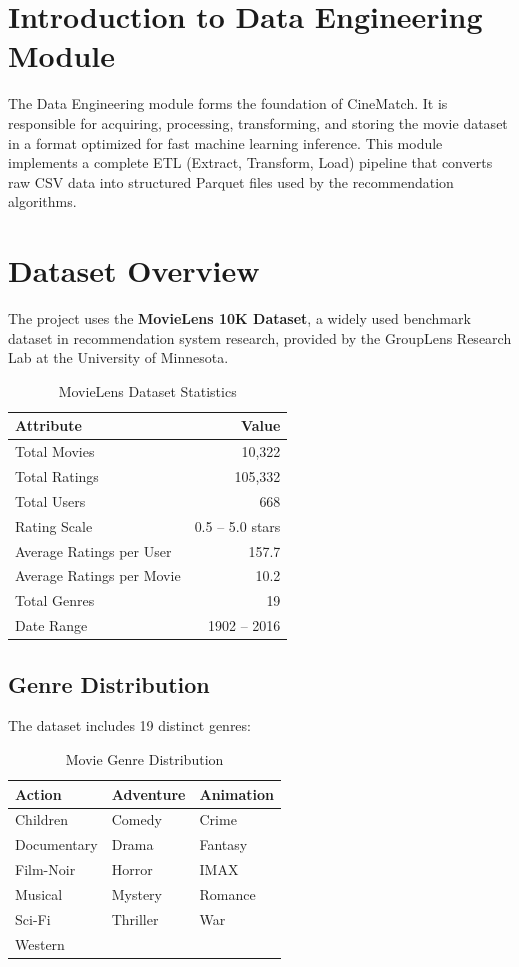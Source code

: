 \documentclass[12pt,a4paper]{report}
\begin{document}
\section{Introduction to Data Engineering Module}

The Data Engineering module forms the foundation of CineMatch. It is responsible for acquiring, processing, transforming, and storing the movie dataset in a format optimized for fast machine learning inference. This module implements a complete ETL (Extract, Transform, Load) pipeline that converts raw CSV data into structured Parquet files used by the recommendation algorithms.

\section{Dataset Overview}

The project uses the \textbf{MovieLens 10K Dataset}, a widely used benchmark dataset in recommendation system research, provided by the GroupLens Research Lab at the University of Minnesota.

\begin{table}[H]
\centering
\caption{MovieLens Dataset Statistics}
\begin{tabular}{|l|r|}
\hline
\textbf{Attribute} & \textbf{Value} \\
\hline
Total Movies & 10,322 \\
Total Ratings & 105,332 \\
Total Users & 668 \\
Rating Scale & 0.5 -- 5.0 stars \\
Average Ratings per User & 157.7 \\
Average Ratings per Movie & 10.2 \\
Total Genres & 19 \\
Date Range & 1902 -- 2016 \\
\hline
\end{tabular}
\end{table}

\subsection{Genre Distribution}

The dataset includes 19 distinct genres:

\begin{table}[H]
\centering
\caption{Movie Genre Distribution}
\begin{tabular}{|l|l|l|}
\hline
Action & Adventure & Animation \\
\hline
Children & Comedy & Crime \\
\hline
Documentary & Drama & Fantasy \\
\hline
Film-Noir & Horror & IMAX \\
\hline
Musical & Mystery & Romance \\
\hline
Sci-Fi & Thriller & War \\
\hline
Western & & \\
\hline
\end{tabular}
\end{table}
\end{document}
